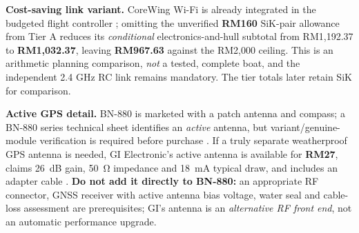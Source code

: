 \textbf{Cost-saving link variant.} CoreWing Wi-Fi is already integrated in the budgeted flight controller \cite{coreDoc}; omitting the unverified \textbf{RM160} SiK-pair allowance from Tier A reduces its \emph{conditional} electronics-and-hull subtotal from RM1,192.37 to \textbf{RM1,032.37}, leaving \textbf{RM967.63} against the RM2,000 ceiling. This is an arithmetic planning comparison, \emph{not} a tested, complete boat, and the independent 2.4 GHz RC link remains mandatory. The tier totals later retain SiK for comparison.\par\medskip\textbf{Active GPS detail.} BN-880 is marketed with a patch antenna and compass; a BN-880 series technical sheet identifies an \emph{active} antenna, but variant/genuine-module verification is required before purchase \cite{bnData,bnMaker,bnShop}. If a truly separate weatherproof GPS antenna is needed, GI Electronic's active antenna is available for \textbf{RM27}, claims \SI{26}{dB} gain, \SI{50}{\ohm} impedance and \SI{18}{mA} typical draw, and includes an adapter cable \cite{activeShop}. \textbf{Do not add it directly to BN-880:} an appropriate RF connector, GNSS receiver with active antenna bias voltage, water seal and cable-loss assessment are prerequisites; GI's antenna is an \emph{alternative RF front end}, not an automatic performance upgrade.

